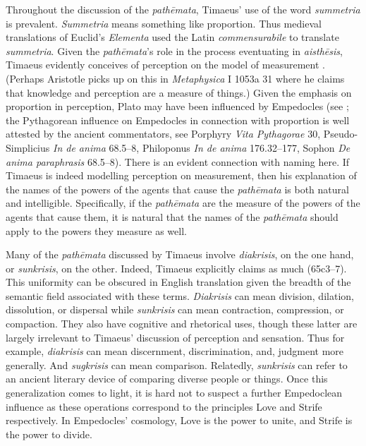 Throughout the discussion of the \emph{pathēmata}, Timaeus' use of the word \emph{summetria} is prevalent. \emph{Summetria} means something like proportion. Thus medieval translations of Euclid's \emph{Elementa} used the Latin \emph{commensurabile} to translate \emph{summetria}. Given the \emph{pathēmata}'s role in the process eventuating in \emph{aisthēsis}, Timaeus evidently conceives of perception on the model of measurement \citep[155--6]{Brisson:1997qr}. (Perhaps Aristotle picks up on this in \emph{Metaphysica} I 1053a 31 where he claims that knowledge and perception are a measure of things.) Given the emphasis on proportion in perception, Plato may have been influenced by Empedocles (see \citealt{Ierodiakonou:2005fk,Ierodiakonou:2005ly}; the Pythagorean influence on Empedocles in connection with proportion is well attested by the ancient commentators, see Porphyry \emph{Vita Pythagorae} 30, Pseudo-Simplicius \emph{In de anima} 68.5--8, Philoponus \emph{In de anima} 176.32--177, Sophon \emph{De anima paraphrasis} 68.5--8). There is an evident connection with naming here. If Timaeus is indeed modelling perception on measurement, then his explanation of the names of the powers of the agents that cause the \emph{pathēmata} is both natural and intelligible. Specifically, if the \emph{pathēmata} are the measure of the powers of the agents that cause them, it is natural that the names of the \emph{pathēmata} should apply to the powers they measure as well. 

Many of the \emph{pathēmata} discussed by Timaeus involve \emph{diakrisis}, on the one hand, or \emph{sunkrisis}, on the other. Indeed, Timaeus explicitly claims as much (65c3--7). This uniformity can be obscured in English translation given the breadth of the semantic field associated with these terms. \emph{Diakrisis} can mean division, dilation, dissolution, or dispersal while \emph{sunkrisis} can mean contraction, compression, or compaction. They also have cognitive and rhetorical uses, though these latter are largely irrelevant to Timaeus' discussion of perception and sensation. Thus for example, \emph{diakrisis} can mean discernment, discrimination, and, judgment more generally. And \emph{sugkrisis} can mean comparison. Relatedly, \emph{sunkrisis} can refer to an ancient literary device of comparing diverse people or things. Once this generalization comes to light, it is hard not to suspect a further Empedoclean influence as these operations correspond to the principles Love and Strife respectively. In Empedocles' cosmology, Love is the power to unite, and Strife is the power to divide.

